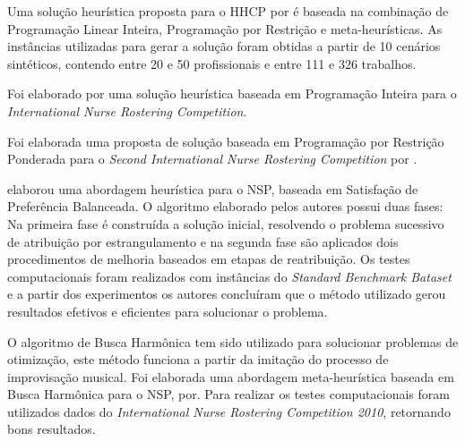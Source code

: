 Uma solução heurística proposta para o \ac{HHCP} por \cite{Bertels:2006} é baseada na combinação de Programação Linear Inteira, Programação por Restrição e meta-heurísticas. As instâncias utilizadas para gerar a solução foram obtidas a partir de 10 cenários sintéticos, contendo entre 20 e 50 profissionais e entre 111 e 326 trabalhos.

Foi elaborado por \cite{gambini:2012} uma solução heurística baseada em Programação Inteira para o \textit{International Nurse Rostering Competition}.

Foi elaborada uma proposta de solução baseada em Programação por Restrição Ponderada para o  \textit{Second International Nurse Rostering Competition} por \cite{santos:2015}.


\cite{constantino:2011} elaborou uma abordagem heurística para o \ac{NSP}, baseada em Satisfação de Preferência Balanceada. O algoritmo elaborado pelos autores possui duas fases: Na primeira fase é construída a solução inicial, resolvendo o problema sucessivo de atribuição por estrangulamento e na segunda fase são aplicados dois procedimentos de melhoria baseados em etapas de reatribuição. Os testes computacionais foram realizados com instâncias do \textit{Standard Benchmark Bataset} e a partir dos experimentos os autores concluíram que o método utilizado gerou resultados efetivos e eficientes para solucionar o problema.


O algoritmo de Busca Harmônica  tem sido utilizado para solucionar problemas de otimização, este método funciona a partir da imitação do processo de improvisação musical.  Foi elaborada uma abordagem meta-heurística baseada em Busca Harmônica para o \ac{NSP}, por\cite{awadallah:2011}. Para realizar os testes computacionais foram utilizados dados do \textit{ International Nurse Rostering Competition 2010}, retornando bons resultados.

